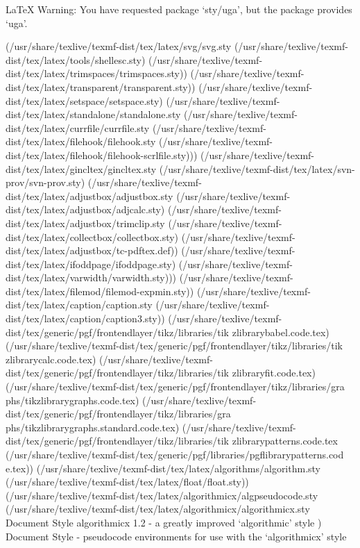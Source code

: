 LaTeX Warning: You have requested package `sty/uga',
               but the package provides `uga'.

(/usr/share/texlive/texmf-dist/tex/latex/svg/svg.sty
(/usr/share/texlive/texmf-dist/tex/latex/tools/shellesc.sty)
(/usr/share/texlive/texmf-dist/tex/latex/trimspaces/trimspaces.sty))
(/usr/share/texlive/texmf-dist/tex/latex/transparent/transparent.sty))
(/usr/share/texlive/texmf-dist/tex/latex/setspace/setspace.sty)
(/usr/share/texlive/texmf-dist/tex/latex/standalone/standalone.sty
(/usr/share/texlive/texmf-dist/tex/latex/currfile/currfile.sty
(/usr/share/texlive/texmf-dist/tex/latex/filehook/filehook.sty
(/usr/share/texlive/texmf-dist/tex/latex/filehook/filehook-scrlfile.sty)))
(/usr/share/texlive/texmf-dist/tex/latex/gincltex/gincltex.sty
(/usr/share/texlive/texmf-dist/tex/latex/svn-prov/svn-prov.sty)
(/usr/share/texlive/texmf-dist/tex/latex/adjustbox/adjustbox.sty
(/usr/share/texlive/texmf-dist/tex/latex/adjustbox/adjcalc.sty)
(/usr/share/texlive/texmf-dist/tex/latex/adjustbox/trimclip.sty
(/usr/share/texlive/texmf-dist/tex/latex/collectbox/collectbox.sty)
(/usr/share/texlive/texmf-dist/tex/latex/adjustbox/tc-pdftex.def))
(/usr/share/texlive/texmf-dist/tex/latex/ifoddpage/ifoddpage.sty)
(/usr/share/texlive/texmf-dist/tex/latex/varwidth/varwidth.sty)))
(/usr/share/texlive/texmf-dist/tex/latex/filemod/filemod-expmin.sty))
(/usr/share/texlive/texmf-dist/tex/latex/caption/caption.sty
(/usr/share/texlive/texmf-dist/tex/latex/caption/caption3.sty))
(/usr/share/texlive/texmf-dist/tex/generic/pgf/frontendlayer/tikz/libraries/tik
zlibrarybabel.code.tex)
(/usr/share/texlive/texmf-dist/tex/generic/pgf/frontendlayer/tikz/libraries/tik
zlibrarycalc.code.tex)
(/usr/share/texlive/texmf-dist/tex/generic/pgf/frontendlayer/tikz/libraries/tik
zlibraryfit.code.tex)
(/usr/share/texlive/texmf-dist/tex/generic/pgf/frontendlayer/tikz/libraries/gra
phs/tikzlibrarygraphs.code.tex)
(/usr/share/texlive/texmf-dist/tex/generic/pgf/frontendlayer/tikz/libraries/gra
phs/tikzlibrarygraphs.standard.code.tex)
(/usr/share/texlive/texmf-dist/tex/generic/pgf/frontendlayer/tikz/libraries/tik
zlibrarypatterns.code.tex
(/usr/share/texlive/texmf-dist/tex/generic/pgf/libraries/pgflibrarypatterns.cod
e.tex)) (/usr/share/texlive/texmf-dist/tex/latex/algorithms/algorithm.sty
(/usr/share/texlive/texmf-dist/tex/latex/float/float.sty))
(/usr/share/texlive/texmf-dist/tex/latex/algorithmicx/algpseudocode.sty
(/usr/share/texlive/texmf-dist/tex/latex/algorithmicx/algorithmicx.sty
Document Style algorithmicx 1.2 - a greatly improved `algorithmic' style
)
Document Style - pseudocode environments for use with the `algorithmicx' style
